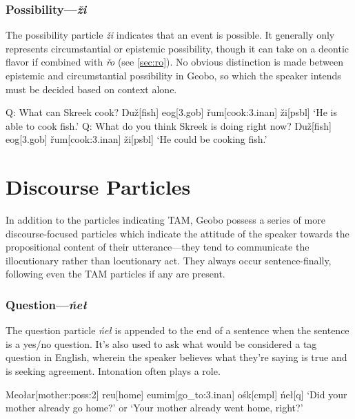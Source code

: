\documentclass[a4paper,11pt,oneside,openany]{memoir}
\newcommand{\vz}{ž}
\newcommand{\vr}{ř}
\newcommand{\Engma}{Ŋ}
\begin{document}


\subsubsection{Possibility---\textit{\vz i}}

The possibility particle \textit{\vz i} indicates that an event is possible. It generally only represents circumstantial or epistemic possibility, though it can take on a deontic flavor if combined with \textit{\vr o} (see \ref{sec:ro}). No obvious distinction is made between epistemic and circumstantial possibility in Geobo{\engma}, so which the speaker intends must be decided based on context alone.

\pex 
\a
\begingl
\glpreamble
Q: What can Skreek cook?
\endpreamble
{}
\Engma u\vz[fish]
eog[\sc 3.gob]
\vr um[cook:{\sc 3.inan}]
\vz i[\sc psbl]
\glft \phantom{A: }`He is able to cook fish.'
\endgl
\a 
\begingl
\glpreamble
Q: What do you think Skreek is doing right now?
\endpreamble
{}
\Engma u\vz[fish]
eog[\sc 3.gob]
\vr um[cook:{\sc 3.inan}]
\vz i[\sc psbl]
\glft \phantom{A: }`He could be cooking fish.'
\endgl
\xe

\section{Discourse Particles}

In addition to the particles indicating TAM, Geobo{\engma} possess a series of more discourse-focused particles which indicate the attitude of the speaker towards the propositional content of their utterance---they tend to communicate the illocutionary rather than locutionary act. They always occur sentence-finally, following even the TAM particles if any are present.

\subsubsection{Question---\textit{\'ne\l}}

The question particle \textit{\'ne\l} is appended to the end of a sentence when the sentence is a yes/no question. It's also used to ask what would be considered a tag question in English, wherein the speaker believes what they're saying is true and is seeking agreement. Intonation often plays a role.

\ex
\begingl
Meo\l ar[mother:{\sc poss:2}]
reu[home]
eumim[go\_to:{\sc 3.inan}]
o\'sk[\sc cmpl]
\'ne\l[\sc q]
\glft `Did your mother already go home?' or `Your mother already went home, right?'
\endgl 
\xe
\end{document}
